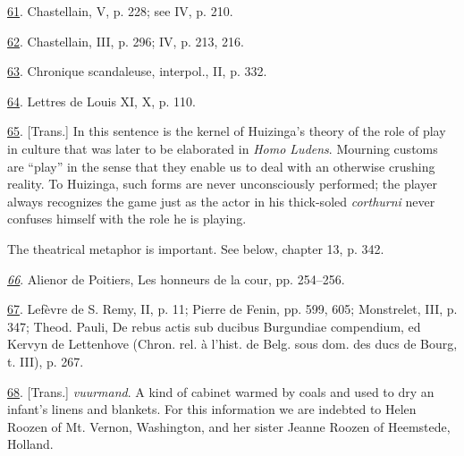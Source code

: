 \protect\hypertarget{23_NOTES.xhtmlux5cux23id_1967}{\protect\hyperlink{09_Chapter_Two__THE_CRAVING_FOR_A_M.xhtmlux5cux23id_1966}{61}}.
Chastellain, V, p. 228; see IV, p. 210.

\protect\hypertarget{23_NOTES.xhtmlux5cux23id_1965}{\protect\hyperlink{09_Chapter_Two__THE_CRAVING_FOR_A_M.xhtmlux5cux23id_1964}{62}}.
Chastellain, III, p. 296; IV, p. 213, 216.

\protect\hypertarget{23_NOTES.xhtmlux5cux23id_1963}{\protect\hyperlink{09_Chapter_Two__THE_CRAVING_FOR_A_M.xhtmlux5cux23id_1962}{63}}.
Chronique scandaleuse, interpol., II, p. 332.

\protect\hypertarget{23_NOTES.xhtmlux5cux23id_1961}{\protect\hyperlink{09_Chapter_Two__THE_CRAVING_FOR_A_M.xhtmlux5cux23id_1960}{64}}.
Lettres de Louis XI, X, p. 110.

\protect\hypertarget{23_NOTES.xhtmlux5cux23id_1959}{\protect\hyperlink{09_Chapter_Two__THE_CRAVING_FOR_A_M.xhtmlux5cux23id_1958}{65}}.
{[}Trans.{]} In this sentence is the kernel of Huizinga's theory of the
role of play in culture that was later to be elaborated in \emph{Homo
Ludens}. Mourning customs are ``play'' in the sense that they enable us
to deal with an otherwise crushing reality. To Huizinga, such forms are
never unconsciously performed; the player always recognizes the game
just as the actor in his thick-soled \emph{corthurni} never confuses
himself with the role he is playing.

The theatrical metaphor is important. See below, chapter 13, p. 342.

\emph{\protect\hypertarget{23_NOTES.xhtmlux5cux23id_1957}{\protect\hyperlink{09_Chapter_Two__THE_CRAVING_FOR_A_M.xhtmlux5cux23id_1956}{66}}}.
Alienor de Poitiers, Les honneurs de la cour, pp. 254--256.

\protect\hypertarget{23_NOTES.xhtmlux5cux23id_1955}{\protect\hyperlink{09_Chapter_Two__THE_CRAVING_FOR_A_M.xhtmlux5cux23id_1954}{67}}.
Lefèvre de S. Remy, II, p. 11; Pierre de Fenin, pp. 599, 605;
Monstrelet, III, p. 347; Theod. Pauli, De rebus actis sub ducibus
Burgundiae compendium, ed Kervyn de Lettenhove (Chron. rel. à l'hist. de
Belg. sous dom. des ducs de Bourg, t. III), p. 267.

\protect\hypertarget{23_NOTES.xhtmlux5cux23page_404}{\protect\hyperlink{09_Chapter_Two__THE_CRAVING_FOR_A_M.xhtmlux5cux23id_1953}{68}}.
{[}Trans.{]} \emph{vuurmand}. A kind of cabinet warmed by coals and used
to dry an infant's linens and blankets. For this information we are
indebted to Helen Roozen of Mt. Vernon, Washington, and her sister
Jeanne Roozen of Heemstede, Holland.

